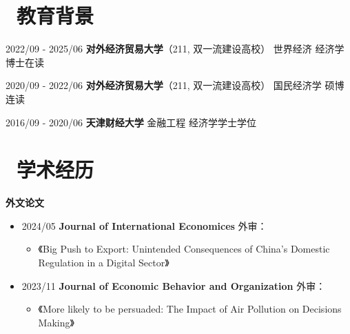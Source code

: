 \documentclass[11pt]{article}
\begin{document}
	
	\section{\makebox[\widthof{\faGraduationCap}][c]{\color{CVBlue}\faGraduationCap}\  教育背景}
	
	2022/09 - 2025/06 \quad \textbf{对外经济贸易大学}（211, 双一流建设高校）  \quad \quad 世界经济 \quad \quad \quad 经济学博士在读
	
	2020/09 - 2022/06 \quad \textbf{对外经济贸易大学}（211, 双一流建设高校）  \quad \quad 国民经济学 \quad \quad 硕博连读
	
	2016/09 - 2020/06 \quad \textbf{天津财经大学} \quad \quad  \quad \quad \quad \quad  \quad \quad  \quad \quad  \quad \quad  \quad \quad  \quad  金融工程 \quad \quad \quad  经济学学士学位
	
	\section{\makebox[\widthof{\faGraduationCap}][c]{\color{CVBlue}\faFileText}\ 学术经历}
	\textbf{外文论文}
	\begin{itemize}
		\item 2024/05  \quad 
		\textbf{Journal of International Economices} 外审：  \vspace{-5pt}
		\begin{itemize}
			\item  《Big Push to Export: Unintended Consequences of China's Domestic Regulation in a Digital Sector》
		\end{itemize}
		
		\vspace{-2pt}
		
		\item 2023/11  \quad
		\textbf{Journal of Economic Behavior and Organization }外审：  \vspace{-5pt}
		\begin{itemize}
			\item  《More likely to be persuaded: The Impact of Air Pollution on Decisions Making》
		\end{itemize}
	\end{itemize}
	
\end{document}
